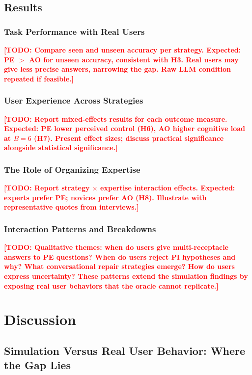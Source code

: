 \documentclass[a4paper,fleqn]{cas-sc}
\newcommand{\TODO}[1]{\textcolor{red}{\textbf{[TODO: #1]}}}
\begin{document}
\subsection{Results}

\subsubsection{Task Performance with Real Users}
\TODO{Compare seen and unseen accuracy per strategy. Expected: PE $>$ AO for unseen accuracy, consistent with H3. Real users may give less precise answers, narrowing the gap. Raw LLM condition repeated if feasible.}

\subsubsection{User Experience Across Strategies}
\TODO{Report mixed-effects results for each outcome measure. Expected: PE lower perceived control (H6), AO higher cognitive load at $B=6$ (H7). Present effect sizes; discuss practical significance alongside statistical significance.}

\subsubsection{The Role of Organizing Expertise}
\TODO{Report strategy $\times$ expertise interaction effects. Expected: experts prefer PE; novices prefer AO (H8). Illustrate with representative quotes from interviews.}

\subsubsection{Interaction Patterns and Breakdowns}
\TODO{Qualitative themes: when do users give multi-receptacle answers to PE questions? When do users reject PI hypotheses and why? What conversational repair strategies emerge? How do users express uncertainty? These patterns extend the simulation findings by exposing real user behaviors that the oracle cannot replicate.}


\section{Discussion}\label{sec:discussion}

\subsection{Simulation Versus Real User Behavior: Where the Gap Lies}
\end{document}

